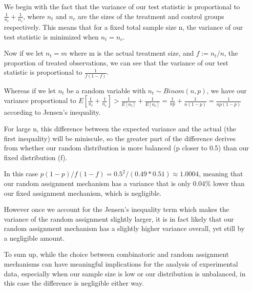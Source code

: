 \documentclass[12pt]{article}
\begin{document}
We begin with the fact that the variance of our test statistic is proportional to $\frac{1}{n_t} + \frac{1}{n_c}$, where $n_t$ and $n_c$ are the sizes of the treatment and control groups respectively. This means that for a fixed total sample size n, the variance of our test statistic is minimized when $n_t = n_c$.
\newline

Now if we let $n_t = m$ where m is the actual treatment size, and $f:= n_t/n$, the proportion of treated observations, we can see that the variance of our test statistic is proportional to $\frac{1}{f(1-f)}$. 
\newline

Whereas if we let $n_t$ be a random variable with $n_t \sim Binom(n,p)$, we have our variance proportional to $E\left[\frac{1}{n_t} + \frac{1}{n_c}\right] > \frac{1}{E[n_t]} + \frac{1}{E[n_c]} = \frac{1}{np} + \frac{1}{n(1-p)} = \frac{1}{n p (1-p)}$ according to Jensen's inequality.
\newline

For large n, this difference between the expected variance and the actual (the first inequality) will be miniscule, so the greater part of the difference derives from whether our random distribution is more balanced (p closer to 0.5) than our fixed distribution (f).
\newline

In this case $p(1-p)/f(1-f) = 0.5^2/(0.49*0.51) \approx 1.0004$, meaning that our random assignment mechanism has a variance that is only 0.04\% lower than our fixed assignment mechanism, which is negligible.
\newline

However once we account for the Jensen's inequality term which makes the variance of the random assignment slightly larger, it is in fact likely that our random assignment mechanism has a slightly higher variance overall, yet still by a negligible amount.

To sum up, while the choice between combinatoric and random assignment mechanisms can have meaningful implications for the analysis of experimental data, especially when our sample size is low or our distribution is unbalanced, in this case the difference is negligible either way.
\end{document}
